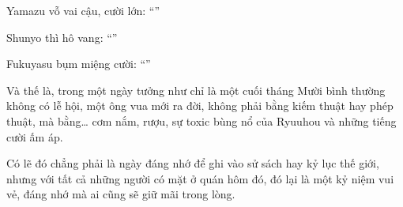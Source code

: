 \documentclass[../main.tex]{subfiles}
\begin{document}
Yamazu vỗ vai cậu, cười lớn: ``''

Shunyo thì hô vang: ``''

Fukuyasu bụm miệng cười: ``''

Và thế là, trong một ngày tưởng như chỉ là một cuối tháng Mười bình thường không có lễ hội, một ông vua mới ra đời, không phải bằng kiếm thuật hay phép thuật, mà bằng\dots{} cơm nắm, rượu, sự toxic bùng nổ của Ryuuhou và những tiếng cười ấm áp.

Có lẽ đó chẳng phải là ngày đáng nhớ để ghi vào sử sách hay kỷ lục thế giới, nhưng với tất cả những người có mặt ở quán hôm đó, đó lại là một kỷ niệm vui vẻ, đáng nhớ mà ai cũng sẽ giữ mãi trong lòng.
\end{document}
